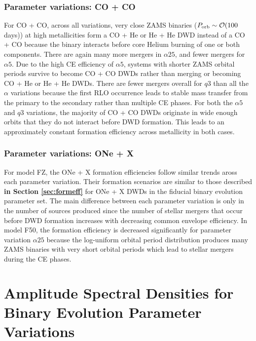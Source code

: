 \documentclass[twocolumn, linenumbers]{aastex631}
\begin{document}
\subsubsection{\textbf{Parameter variations: CO + 
CO}}\label{formeff_CO_vars}
For CO + CO, across all variations, very close ZAMS binaries 
($P_{\rm{orb}}\sim\mathcal{O}(100$ days)) at high metallicities form a CO 
+ He or He + He DWD instead of a CO + CO because the binary interacts 
before core Helium burning of one or both components. There are again many 
more mergers in $\alpha25$, and fewer mergers for $\alpha5$. Due to the 
high CE efficiency of $\alpha5$, systems with shorter ZAMS orbital periods 
survive to become CO + CO DWDs rather than merging or becoming CO + He or 
He + He DWDs. There are fewer mergers overall for $q3$ than all the 
$\alpha$ variations because the first RLO occurrence leads to stable mass 
transfer from the primary to the secondary rather than multiple CE phases. 
For both the $\alpha5$ and $q3$ variations, the majority of CO + CO DWDs 
originate in wide enough orbits that they do not interact before DWD 
formation. This leads to an approximately constant formation efficiency 
across metallicity in both cases.

\subsubsection{\textbf{Parameter variations: ONe + 
X}}\label{formeff_ONe_vars}
For model FZ, the ONe + X formation efficiencies follow similar trends 
aross each parameter variation. Their formation scenarios are similar to 
those described \textbf{in Section \ref{sec:formeff}} for ONe + X DWDs in 
the fiducial binary evolution parameter set. The main difference between 
each parameter variation is only in the number of sources produced since 
the number of stellar mergers that occur before DWD formation increases 
with decreasing common envelope efficiency. In model F50, the formation 
efficiency is decreased significantly for parameter variation $\alpha25$ 
because the log-uniform orbital period distribution produces many ZAMS 
binaries with very short orbital periods which lead to stellar mergers 
during the CE phases.


\section{Amplitude Spectral Densities for Binary Evolution Parameter 
Variations}\label{appendix:ASD_vars}
\end{document}

